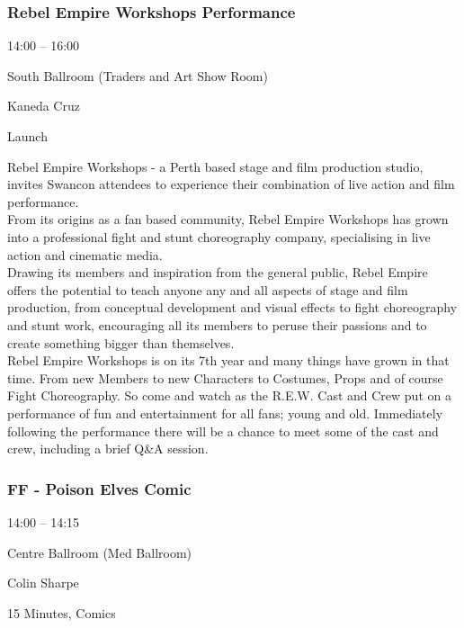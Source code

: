 \documentclass{scrreprt}
\begin{document}
\begin{multicols}{2}
\subsubsection*{Rebel Empire Workshops Performance}\begin{description}
\setlength{\itemsep}{0pt}
\setlength{\parsep}{0pt}
\setlength{\parskip}{0pt}
\item[Time:]{14:00 -- 16:00}
\item[Venue:]{South Ballroom (Traders and Art Show Room)}
\item[People:]{Kaneda Cruz}
\item[Tags:]{Launch}\end{description}
Rebel Empire Workshops - a Perth based stage and film production studio, invites Swancon attendees to experience their combination of live action and film performance.\\From its origins as a fan based community, Rebel Empire Workshops has grown into a professional fight and stunt choreography company, specialising in live action and cinematic media. \\Drawing its members and inspiration from the general public, Rebel Empire offers the potential to teach anyone any and all aspects of stage and film production, from conceptual development and visual effects to fight choreography and stunt work, encouraging all its members to peruse their passions and to create something bigger than themselves.\\Rebel Empire Workshops is on its 7th year and many things have grown in that time. From new Members to new Characters to Costumes, Props and of course Fight Choreography. So come and watch as the R.E.W. Cast and Crew put on a performance of fun and entertainment for all fans; young and old. Immediately following the performance there will be a chance to meet some of the cast and crew, including a brief Q\&A session.
\subsubsection*{FF - Poison Elves Comic}\begin{description}
\setlength{\itemsep}{0pt}
\setlength{\parsep}{0pt}
\setlength{\parskip}{0pt}
\item[Time:]{14:00 -- 14:15}
\item[Venue:]{Centre Ballroom (Med Ballroom)}
\item[People:]{Colin Sharpe}
\item[Tags:]{15 Minutes, Comics}\end{description}


\end{multicols}
\end{document}

